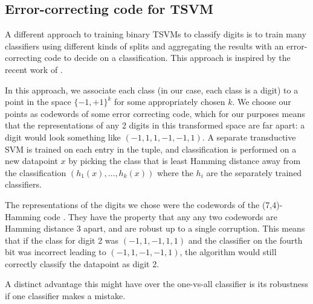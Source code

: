 \documentclass[11pt]{article}
\begin{document}
\subsection{Error-correcting code for TSVM}
\label{codes}
A different approach to training binary TSVMs to classify digits is  to train many classifiers using different kinds of splits and aggregating the results with an error-correcting code to decide on a classification. This approach is inspired by the recent work of \cite{DBLP:journals/corr/BalcanDM15}.

In this approach, we associate each class (in our case, each class
is a digit) to a point in the space $\{-1,+1\}^k$
for some appropriately chosen $k$. We choose our points as codewords
of some error correcting code, which for our purposes means that the
representations of any 2 digits in this transformed space are
far apart: a digit would look something like $(-1,1,1,-1,-1,1)$.
A separate transductive SVM is trained on each entry in the tuple,
and classification is performed on a new datapoint $x$ by picking the
class that is least Hamming distance away from the classification
$(h_1(x),\ldots,h_k(x))$ where the $h_i$ are the separately trained
classifiers.

The representations of the digits we chose were the codewords of the
(7,4)-Hamming code \cite{macwilliams1977theory}. They have the property that any
any two codewords are Hamming distance 3 apart, and are robust up to
a single corruption. This means that if the class for digit 2 was
$(-1,1,-1,1,1)$ and the classifier on the fourth bit was incorrect
leading to $(-1,1,-1,-1,1)$, the algorithm would still correctly
classify the datapoint as digit 2.

A distinct advantage this might have over the one-vs-all
classifier is its robustness if one classifier makes a mistake.


\end{document}
